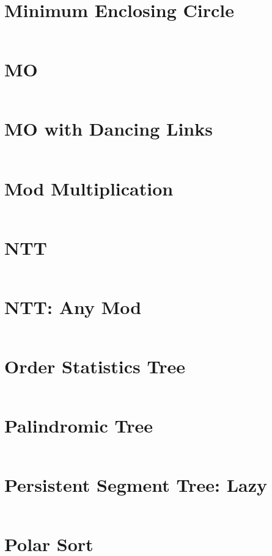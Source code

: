 \documentclass{article}
\begin{document}
\begin{multicols}{3}[
	\maketitle
    \begin{center}
        \rule{\textwidth}{2pt}
    \end{center}
]
\section{Minimum Enclosing Circle}
\inputminted{cpp}{src/MinimumEnclosingCircle.cpp}

\section{MO}
\inputminted{cpp}{src/MO.cc}

\section{MO with Dancing Links}
\inputminted{cpp}{src/MOWithDancingLinks.cpp}

\section{Mod Multiplication}
\inputminted{cpp}{src/ModMultiplication.cpp}

\section{NTT}
\inputminted{cpp}{src/NTT.cpp}

\section{NTT: Any Mod}
\inputminted{cpp}{src/NTTanymod.cpp}

\section{Order Statistics Tree}
\inputminted{cpp}{src/OST.cc}

\section{Palindromic Tree}
\inputminted{cpp}{src/PalindromicTree.cpp}

\section{Persistent Segment Tree: Lazy}
\inputminted{cpp}{src/PersistentSegmentTreeLazy.cpp}

\section{Polar Sort}
\inputminted{cpp}{src/PolarSort.cc}


\end{multicols}
\end{document}

